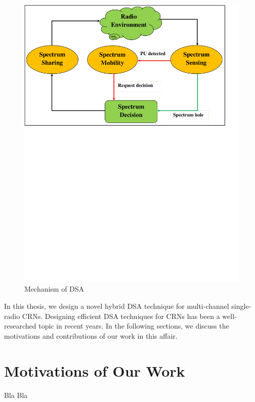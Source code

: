   
\begin{figure}[!htb]
\vspace{3mm}
\begin{center}
	\includegraphics[scale=0.5]{figures/DSA.pdf}
	\vspace{-78mm}
	\caption{Mechanism of DSA}
	\label{fig:DSA}
\end{center}
\vspace{-7mm}
\end{figure}

In this thesis, we design a novel hybrid DSA technique for multi-channel single-radio CRNs. Designing efficient DSA techniques for CRNs has been a well-researched topic in recent years. In the following sections, we discuss the motivations and contributions of our work in this affair.



\section{Motivations of Our Work}
Bla Bla

